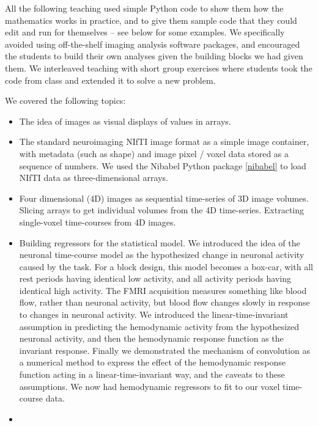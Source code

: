 All the following teaching used simple Python code to show them how the
mathematics works in practice, and to give them sample code that they could
edit and run for themselves -- see below for some examples.  We specifically
avoided using off-the-shelf imaging analysis software packages, and encouraged
the students to build their own analyses given the building blocks we had
given them.  We interleaved teaching with short group exercises where students
took the code from class and extended it to solve a new problem.

We covered the following topics:

\begin{itemize}

\item
    The idea of images as visual displays of values in arrays.
\item
    The standard neuroimaging NIfTI image format as a simple image container,
        with metadata (such as shape) and image pixel / voxel data stored as
        a sequence of numbers.  We used the Nibabel Python package
        \cref{nibabel} to load NIfTI data as three-dimensional arrays.
\item
    Four dimensional (4D) images as sequential time-series of 3D image
        volumes.  Slicing arrays to get individual volumes from the 4D
        time-series.  Extracting single-voxel time-courses from 4D images.
\item
    Building regressors for the statistical model.  We introduced the idea of
        the neuronal time-course model as the hypothesized change in neuronal
        activity caused by the task.  For a block design, this model becomes a
        box-car, with all rest periods having identical low activity, and all
        activity periods having identical high activity.  The FMRI acquisition
        measures something like blood flow, rather than neuronal activity, but
        blood flow changes slowly in response to changes in neuronal activity.
        We introduced the linear-time-invariant assumption in predicting the
        hemodynamic activity from the hypothesized neuronal activity, and then
        the hemodynamic response function as the invariant response.  Finally
        we demonstrated the mechanism of convolution as a numerical method to
        express the effect of the hemodynamic response function acting in a
        linear-time-invariant way, and the caveats to these assumptions.  We
        now had hemodynamic regressors to fit to our voxel time-course data.
\item

\end{itemize}
